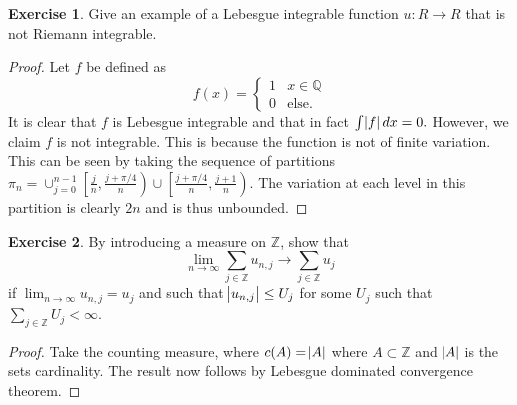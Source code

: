 \documentclass{amsart}
\theoremstyle{plain}
\theoremstyle{definition}
\newtheorem{exer}{Exercise}[section]
\newcommand{\Z}{\mathbb{Z}}
\newcommand{\Q}{\mathbb{Q}}
\begin{document}
\begin{exer}
    Give an example of a Lebesgue integrable function $u : R \to R$ that is not Riemann integrable.
\end{exer}
\begin{proof}
Let $f$ be defined as 
$$f(x) = \begin{cases}
    1 & x\in \Q\\
    0& \text{else}.
\end{cases}$$
It is clear that $f$ is Lebesgue integrable and that in fact $\int \abs{f}dx = 0.$ However, we claim $f$ is not integrable. This is because the function is not of finite variation. This can be seen by taking the sequence of partitions $\pi_n=\cup_{j=0}^{n-1} \left[\frac{j}{n}, \frac{j+\pi/4}{n}\right) \cup \left[\frac{j+\pi/4}{n},\frac{j+1}{n}\right)$. The variation at each level in this partition is clearly $2n$ and is thus unbounded. 
\end{proof}

\begin{exer}
    By introducing a measure on $\Z$, show that 
    $$\lim_{n\to \infty} \sum_{j\in \Z} u_{n,j} \to \sum_{j\in \Z} u_{j}$$
    if $\lim_{n\to\infty} u_{n,j} = u_{j}$ and such that $\abs{u_{n,j}} \leq U_{j}$ for some $U_j$ such that $\sum_{j\in\Z} U_j < \infty.$
\end{exer}
\begin{proof}
    Take the counting measure, where $c(A) = \abs{A}$ where $A\subset \Z$ and $\abs{A}$ is the sets cardinality. The result now follows by Lebesgue dominated convergence theorem. 
\end{proof}
\end{document}
